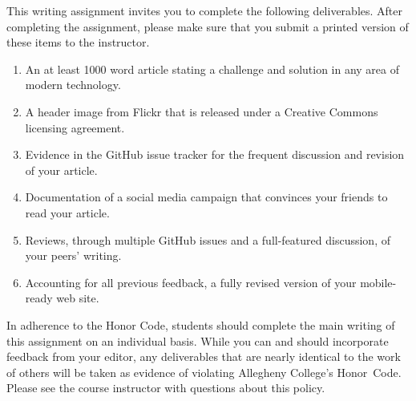 This writing assignment invites you to complete the following deliverables. After completing the assignment, please make
sure that you submit a printed version of these items to the instructor.

\vspace*{-.1in}
\begin{enumerate}
  \setlength{\itemsep}{-.01in}

  \item An at least 1000 word article stating a challenge and solution in any area of modern technology.
  \item A header image from Flickr that is released under a Creative Commons licensing agreement.
  \item Evidence in the GitHub issue tracker for the frequent discussion and revision of your article.
  \item Documentation of a social media campaign that convinces your friends to read your article.
  \item Reviews, through multiple GitHub issues and a full-featured discussion, of your peers' writing.
  \item Accounting for all previous feedback, a fully revised version of your mobile-ready web site.

\end{enumerate}
\vspace*{-.1in}



In adherence to the Honor Code, students should complete the main writing of this assignment on an individual basis.
While you can and should incorporate feedback from your editor, any deliverables that are nearly identical to the work
of others will be taken as evidence of violating Allegheny College's \mbox{Honor Code}. Please see the course instructor
with questions about this policy.


